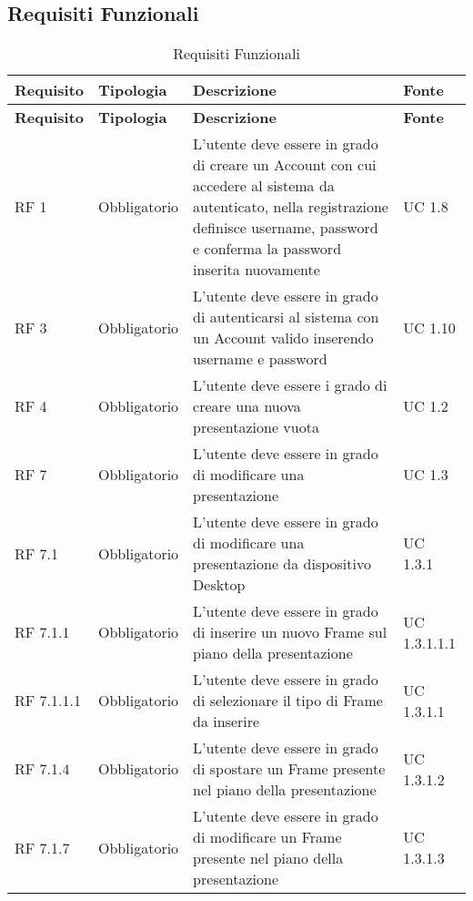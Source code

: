 \subsection{Requisiti Funzionali}{
		\renewcommand*{\arraystretch}{1.4}
		\begin{longtable} [c]{| p{2.5cm} | p{2.5cm} | p{6cm} |p{2.5cm}|}
			\caption{Requisiti Funzionali \label{tab:reqFunzionali}}\\
			 \hline
			 \textbf{Requisito} & \textbf{Tipologia} & \textbf{Descrizione} & \textbf{Fonte} \\
			 \hline
			 \endfirsthead
			 \hline
			 \textbf{Requisito} & \textbf{Tipologia} & \textbf{Descrizione} & \textbf{Fonte} \\
			 \hline
				\endhead
			 \hline
			 \endfoot
			 \hline
			 \endlastfoot
			RF 1 & Obbligatorio & L'utente deve essere in grado di creare un Account\ped{g} con cui accedere al sistema da autenticato, nella registrazione definisce username, password e conferma la password inserita nuovamente & UC 1.8\\
			\hline
			RF 3 & Obbligatorio & L'utente deve essere in grado di autenticarsi al sistema con un Account\ped{g} valido inserendo username e password & UC 1.10\\
			\hline
			RF 4 & Obbligatorio & L’utente deve essere i grado di creare una nuova presentazione vuota & UC 1.2\\
			\hline	
			RF 7 & Obbligatorio & L'utente deve essere in grado di modificare una presentazione & UC 1.3\\
			\hline
			RF 7.1 & Obbligatorio & L'utente deve essere in grado di modificare una presentazione da dispositivo Desktop\ped{g} & UC 1.3.1\\						
			\hline
			RF 7.1.1 & Obbligatorio & L'utente deve essere in grado di inserire un nuovo Frame\ped{g} sul piano della presentazione\ped{g} & UC 1.3.1.1.1\\
			\hline
			RF 7.1.1.1 & Obbligatorio & L'utente deve essere in grado di selezionare il tipo di Frame\ped{g} da inserire & UC 1.3.1.1\\
			\hline
			RF 7.1.4 & Obbligatorio & L'utente deve essere in grado di spostare un Frame\ped{g} presente nel piano della presentazione\ped{g} & UC 1.3.1.2\\
			\hline
			RF 7.1.7 & Obbligatorio & L'utente deve essere in grado di modificare un Frame\ped{g} presente nel piano della presentazione\ped{g} & UC 1.3.1.3\\
			\hline

\end{longtable}}
